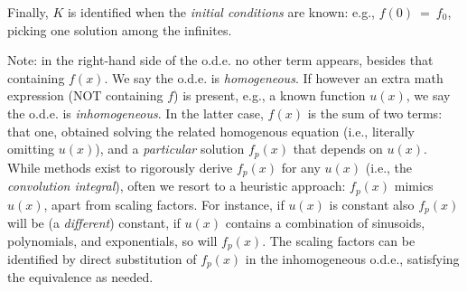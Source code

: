 \begin{svgraybox}
	Finally, $K$ is identified when the \textit{initial conditions} are known: e.g., $f(0)\ =\ f_0$, picking one solution among the infinites.

	Note: in the right-hand side of the o.d.e. no other term appears, besides that containing $f(x)$. We say the o.d.e. is \textit{homogeneous}. If however an extra math expression (NOT containing $f$) is present, e.g., a known function $u(x)$, we say the o.d.e. is \textit{inhomogeneous}. In the latter case, $f(x)$ is the sum of two terms: that one, obtained solving the related homogenous equation (i.e., literally omitting $u(x)$), and a \textit{particular} solution $f_p(x)$ that depends on $u(x)$. While methods exist to rigorously derive $f_p(x)$ for any $u(x)$ (i.e., the \textit{convolution integral}), often we resort to a heuristic approach: $f_p(x)$ mimics $u(x)$, apart from scaling factors. For instance, if $u(x)$ is constant also $f_p(x)$ will be (a \textit{different}) constant, if $u(x)$ contains a combination of sinusoids, polynomials, and exponentials, so will $f_p(x)$. The scaling factors can be identified by direct substitution of $f_p(x)$ in the inhomogeneous o.d.e., satisfying the equivalence as needed. 


	
	






\end{svgraybox}


